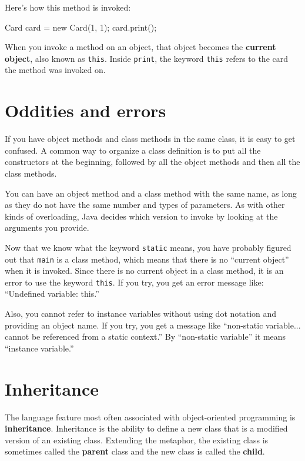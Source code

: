 Here's how this method is invoked:

\begin{code}
    Card card = new Card(1, 1);
    card.print();
\end{code}

When you invoke a method on an object, that object becomes the {\bf
current object}, also known as {\tt this}.  Inside {\tt print},
the keyword {\tt this} refers to the card the method was invoked on.


\section{Oddities and errors}


If you have object methods and class methods in the same class, it is
easy to get confused.  A common way to organize a class definition is
to put all the constructors at the beginning, followed by all the
object methods and then all the class methods.

You can have an object method and a class method with the same
name, as long as they do not have the same number and types of
parameters.  As with other kinds of overloading, Java decides
which version to invoke by looking at the arguments you provide.

Now that we know what the keyword {\tt static} means, you
have probably figured out that {\tt main} is a class method,
which means that there is no ``current object'' when it is invoked.
%
Since there is no current object in a class method, it is an
error to use the keyword {\tt this}.  If you try, you get
an error message like: ``Undefined variable: this.''

Also, you cannot refer to instance variables without using dot
notation and providing an object name.  If you try, you get a message
like ``non-static variable... cannot be referenced from a static
context.''  By ``non-static variable'' it means ``instance variable.''


\section{Inheritance}

The language feature most often associated with object-oriented programming is {\bf inheritance}.
Inheritance is the ability to define a new class that is a modified version of an existing class.
%
Extending the metaphor, the existing class is sometimes called the {\bf parent} class and the new class is called the {\bf child}.

